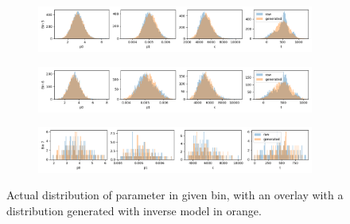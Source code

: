 \begin{figure}[H]
\begin{subfigure}[b]{0.85\textwidth}
  \end{subfigure}
\begin{subfigure}[b]{0.85\textwidth}
    \centering
    \includegraphics[width=\linewidth]{figures/chapter4/surrogates/p3_histos_pre_5.png}
  \end{subfigure}
\begin{subfigure}[b]{0.85\textwidth}
    \centering
    \includegraphics[width=\linewidth]{figures/chapter4/surrogates/p3_histos_pre_6.png}
  \end{subfigure}
\begin{subfigure}[b]{0.85\textwidth}
    \centering
    \includegraphics[width=\linewidth]{figures/chapter4/surrogates/p3_histos_pre_7.png}
  \end{subfigure}

    \label{plot:model_s8_pre}
  \caption[model pre ir]{Actual distribution of parameter in given bin, with an overlay with a distribution generated with inverse model in orange.}
\end{figure}

